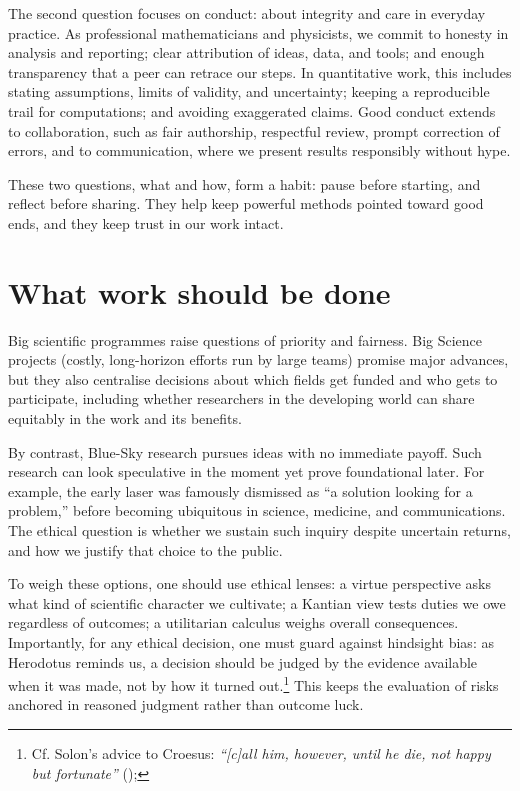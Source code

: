 \documentclass[
  a4paper,
  DIV=11,
  numbers=noendperiod,
  oneside]{scrreprt}
\begin{document}
The second question focuses on conduct: about integrity and care in
everyday practice. As professional mathematicians and physicists, we
commit to honesty in analysis and reporting; clear attribution of ideas,
data, and tools; and enough transparency that a peer can retrace our
steps. In quantitative work, this includes stating assumptions, limits
of validity, and uncertainty; keeping a reproducible trail for
computations; and avoiding exaggerated claims. Good conduct extends to
collaboration, such as fair authorship, respectful review, prompt
correction of errors, and to communication, where we present results
responsibly without hype.

These two questions, what and how, form a habit: pause before starting,
and reflect before sharing. They help keep powerful methods pointed
toward good ends, and they keep trust in our work intact.

\section{What work should be done}\label{what-work-should-be-done}

Big scientific programmes raise questions of priority and fairness. Big
Science projects (costly, long-horizon efforts run by large teams)
promise major advances, but they also centralise decisions about which
fields get funded and who gets to participate, including whether
researchers in the developing world can share equitably in the work and
its benefits.

By contrast, Blue-Sky research pursues ideas with no immediate payoff.
Such research can look speculative in the moment yet prove foundational
later. For example, the early laser was famously dismissed as ``a
solution looking for a problem,'' before becoming ubiquitous in science,
medicine, and communications. The ethical question is whether we sustain
such inquiry despite uncertain returns, and how we justify that choice
to the public.

To weigh these options, one should use ethical lenses: a virtue
perspective asks what kind of scientific character we cultivate; a
Kantian view tests duties we owe regardless of outcomes; a utilitarian
calculus weighs overall consequences. Importantly, for any ethical
decision, one must guard against hindsight bias: as Herodotus reminds
us, a decision should be judged by the evidence available when it was
made, not by how it turned out.\footnote{Cf. Solon's advice to Croesus:
  \emph{``{[}c{]}all him, however, until he die, not happy but
  fortunate''} ();} This keeps the evaluation of risks
anchored in reasoned judgment rather than outcome luck.
\end{document}
